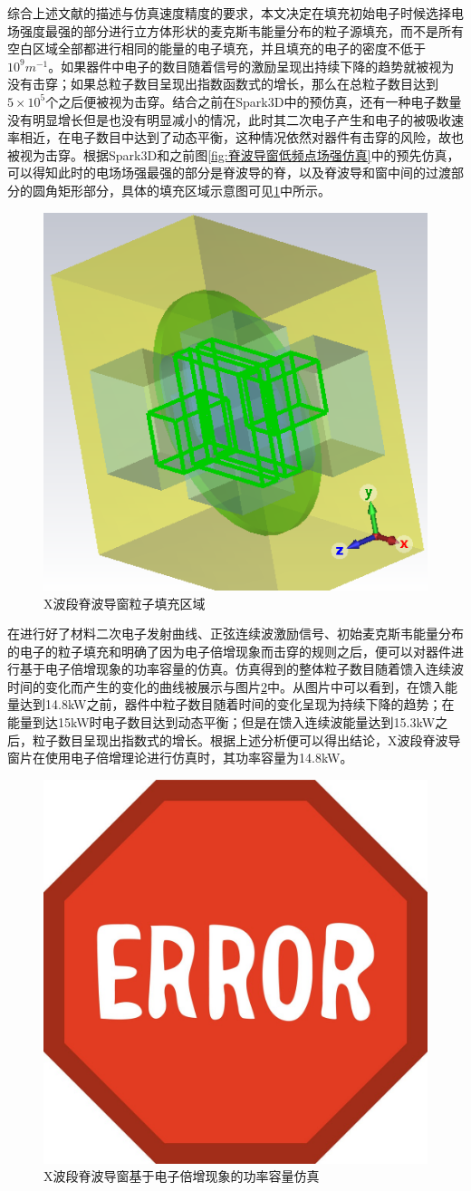 \documentclass[master]{thesis-uestc}
\begin{document}
综合上述文献的描述与仿真速度精度的要求，本文决定在填充初始电子时候选择电场强度最强的部分进行立方体形状的麦克斯韦能量分布的粒子源填充，而不是所有空白区域全部都进行相同的能量的电子填充，并且填充的电子的密度不低于$10^9 m^{-1}$。如果器件中电子的数目随着信号的激励呈现出持续下降的趋势就被视为没有击穿；如果总粒子数目呈现出指数函数式的增长，那么在总粒子数目达到$5 \times 10^5$个之后便被视为击穿。结合之前在Spark3D中的预仿真，还有一种电子数量没有明显增长但是也没有明显减小的情况，此时其二次电子产生和电子的被吸收速率相近，在电子数目中达到了动态平衡，这种情况依然对器件有击穿的风险，故也被视为击穿。根据Spark3D和之前图\ref{fig:脊波导窗低频点场强仿真}中的预先仿真，可以得知此时的电场场强最强的部分是脊波导的脊，以及脊波导和窗中间的过渡部分的圆角矩形部分，具体的填充区域示意图可见\ref{fig:X粒子填充区域}中所示。
\begin{figure}[!htb]
    \centering
    \includegraphics[width=0.5\linewidth]{pic/chapter3/粒子填充区域斜视图.png}
    \caption{X波段脊波导窗粒子填充区域}
    \label{fig:X粒子填充区域}
\end{figure}

在进行好了材料二次电子发射曲线、正弦连续波激励信号、初始麦克斯韦能量分布的电子的粒子填充和明确了因为电子倍增现象而击穿的规则之后，便可以对器件进行基于电子倍增现象的功率容量的仿真。仿真得到的整体粒子数目随着馈入连续波时间的变化而产生的变化的曲线被展示与图片\ref{fig:X波段脊波导窗基于电子倍增现象的功率容量仿真}中。从图片中可以看到，在馈入能量达到14.8kW之前，器件中粒子数目随着时间的变化呈现为持续下降的趋势；在能量到达15kW时电子数目达到动态平衡；但是在馈入连续波能量达到15.3kW之后，粒子数目呈现出指数式的增长。根据上述分析便可以得出结论，X波段脊波导窗片在使用电子倍增理论进行仿真时，其功率容量为14.8kW。
\begin{figure}[!htb]
    \centering
    \includegraphics[width=0.5\linewidth]{pic/ERROR.jpg}
    \caption{X波段脊波导窗基于电子倍增现象的功率容量仿真}
    \label{fig:X波段脊波导窗基于电子倍增现象的功率容量仿真}
\end{figure}
\end{document}
